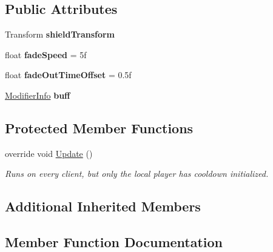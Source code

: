 \subsection*{Public Attributes}
\begin{DoxyCompactItemize}
\item 
\hypertarget{class_projectile_reflect_a0f3974526bc7cd1d0d7135ad96c9c6e5}{}\label{class_projectile_reflect_a0f3974526bc7cd1d0d7135ad96c9c6e5} 
Transform {\bfseries shield\+Transform}
\item 
\hypertarget{class_projectile_reflect_aa2d2a31f34dfd81a56ce4e7b3778ca47}{}\label{class_projectile_reflect_aa2d2a31f34dfd81a56ce4e7b3778ca47} 
float {\bfseries fade\+Speed} = 5f
\item 
\hypertarget{class_projectile_reflect_a25e23eadf1b9913794a0f7be63e98ddd}{}\label{class_projectile_reflect_a25e23eadf1b9913794a0f7be63e98ddd} 
float {\bfseries fade\+Out\+Time\+Offset} = 0.\+5f
\item 
\hypertarget{class_projectile_reflect_a704f7eea0e2d21ce1d05e21174d6d70e}{}\label{class_projectile_reflect_a704f7eea0e2d21ce1d05e21174d6d70e} 
\hyperlink{struct_modifier_info}{Modifier\+Info} {\bfseries buff}
\end{DoxyCompactItemize}
\subsection*{Protected Member Functions}
\begin{DoxyCompactItemize}
\item 
override void \hyperlink{class_projectile_reflect_a81fc744408af168fb772d1c1f70d6f74}{Update} ()
\begin{DoxyCompactList}\small\item\em Runs on every client, but only the local player has cooldown initialized. \end{DoxyCompactList}\end{DoxyCompactItemize}
\subsection*{Additional Inherited Members}


\subsection{Member Function Documentation}
\hypertarget{class_projectile_reflect_a2a01121d450348b198cac9cef206fa29}{}\label{class_projectile_reflect_a2a01121d450348b198cac9cef206fa29} 
